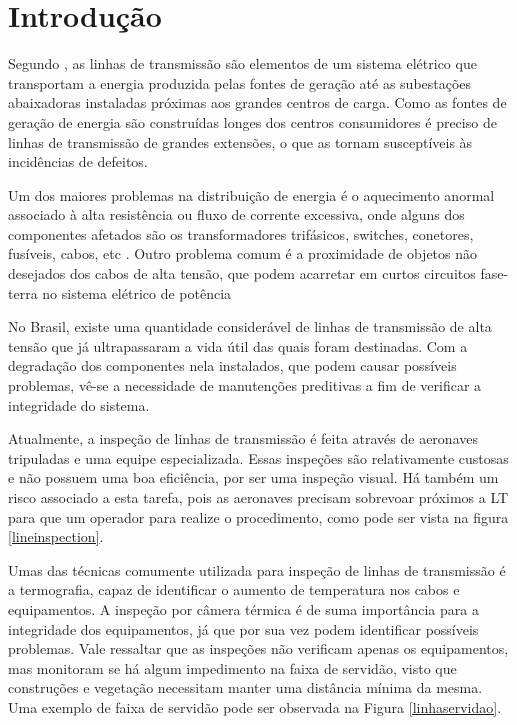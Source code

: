 \chapter{Introdução}
\label{chap:intro}

Segundo , as linhas de transmissão são elementos de um sistema elétrico que transportam a energia produzida pelas fontes de geração até as subestações abaixadoras instaladas próximas aos grandes centros de carga. Como as fontes de geração
de energia são construídas longes dos centros consumidores é preciso de linhas de transmissão de grandes extensões, o que as tornam susceptíveis às incidências de defeitos.

Um dos maiores problemas na distribuição de energia é o aquecimento anormal associado à alta resistência ou fluxo de corrente excessiva, onde alguns dos componentes afetados são os transformadores trifásicos, switches, conetores, fusíveis, cabos, etc \cite{canahuire}. Outro problema comum é a proximidade de objetos não desejados dos cabos de alta tensão, que podem acarretar em curtos circuitos fase-terra no sistema elétrico de potência

No Brasil, existe uma quantidade considerável de linhas de transmissão de alta tensão que já ultrapassaram a vida útil das quais foram destinadas. Com a degradação dos componentes nela instalados, que podem causar possíveis problemas, vê-se a necessidade de manutenções preditivas a fim de verificar a integridade do sistema.

Atualmente, a inspeção de linhas de transmissão é feita através de aeronaves tripuladas e uma equipe especializada. Essas inspeções são relativamente custosas e não possuem uma boa eficiência, por ser uma inspeção visual. Há também um risco associado a esta tarefa, pois as aeronaves precisam sobrevoar próximos a LT para que um operador para realize o procedimento, como pode ser vista na figura \ref{lineinspection}.

Umas das técnicas comumente utilizada para inspeção de linhas de transmissão é a termografia, capaz de identificar o aumento de temperatura nos cabos e equipamentos.  A inspeção por câmera térmica é de suma importância para a integridade dos equipamentos, já que por sua vez podem identificar possíveis problemas. Vale ressaltar que as inspeções não verificam apenas os equipamentos, mas monitoram se há algum impedimento na faixa de servidão, visto que construções e vegetação necessitam manter uma distância mínima da mesma. Uma exemplo de faixa de servidão pode ser observada na Figura \ref{linhaservidao}.

